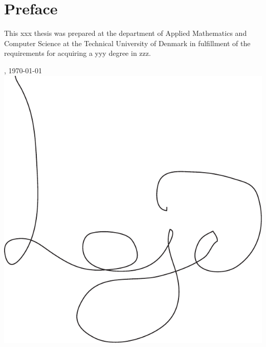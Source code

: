 \chapter{Preface}
This xxx thesis was prepared at the department of Applied Mathematics and Computer Science at the Technical University of Denmark in fulfillment of the requirements for acquiring a yyy degree in zzz.

\vfill

\begin{center}
    \thesislocation{}, \today\\[1cm]
    \hspace{3cm}\includegraphics[scale=0.4]{graphics/Signature}\\[1cm]
\end{center}
\begin{flushright}
    \thesisauthor{}
\end{flushright}
